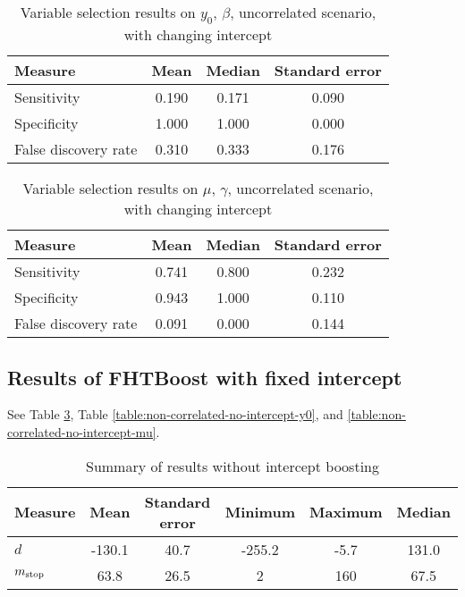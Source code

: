 \begin{table}
\caption{Variable selection results on $y_0$, $\beta$, uncorrelated scenario, with changing intercept}
\label{table:non-correlated-with-intercept-y0}
\centering
\begin{tabular}{lccc}
\toprule
Measure &  Mean & Median & Standard error \\
\hline
Sensitivity & 0.190 &  0.171 & 0.090 \\
Specificity & 1.000 &  1.000 & 0.000 \\
False discovery rate & 0.310 &  0.333 & 0.176 \\
\bottomrule
\end{tabular}
\end{table}


\begin{table}\caption{Variable selection results on $\mu$, $\gamma$, uncorrelated scenario, with changing intercept}
\label{table:non-correlated-with-intercept-mu}
\centering
\begin{tabular}{lccc}
\toprule
Measure     & Mean  & Median & Standard error     \\
\hline
Sensitivity & 0.741 &  0.800 & 0.232 \\
Specificity & 0.943 &  1.000 & 0.110 \\
False discovery rate & 0.091 &  0.000 & 0.144 \\
\bottomrule
\end{tabular}
\end{table}



\subsection{Results of FHTBoost with fixed intercept}
See Table \ref{table:non-correlated-no-intercept-summary}, Table \ref{table:non-correlated-no-intercept-y0}, and \ref{table:non-correlated-no-intercept-mu}.


\begin{table}
\caption{Summary of results without intercept boosting}
\label{table:non-correlated-no-intercept-summary}
\centering
\begin{tabular}{lccccc}
\toprule
Measure &    Mean &     Standard error &  Minimum & Maximum & Median \\
\hline
$d$    &   -130.1 & 40.7 &   -255.2   &   -5.7 & 131.0 \\
$m_{\text{stop}}$      &    63.8 & 26.5 &     2 &   160 & 67.5 \\
\bottomrule
\end{tabular}
\end{table}

